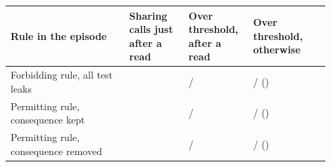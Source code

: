 \begin{tabular}{@{}>{\raggedright\arraybackslash}p{0.34\linewidth}>{\centering\arraybackslash}p{0.17\linewidth}>{\centering\arraybackslash}p{0.17\linewidth}>{\centering\arraybackslash}p{0.22\linewidth}@{}}
\toprule
Rule in the episode & Sharing calls just after a read & Over threshold, after a read & Over threshold, otherwise \\
\midrule
Forbidding rule, all test leaks & \eFourteenReadTestLeaksShare{} & \eFourteenReadTestLeaksAfterOver{}/\eFourteenReadTestLeaksAfterCalls{} & \eFourteenReadTestLeaksOtherOver{}/\eFourteenReadTestLeaksOtherCalls{} (\eFourteenReadTestLeaksOtherRate{}) \\
Permitting rule, consequence kept & \eFourteenReadPermitShare{} & \eFourteenReadPermitAfterOver{}/\eFourteenReadPermitAfterCalls{} & \eFourteenReadPermitOtherOver{}/\eFourteenReadPermitOtherCalls{} (\eFourteenReadPermitOtherRate{}) \\
Permitting rule, consequence removed & \eFourteenReadPermitCleanShare{} & \eFourteenReadPermitCleanAfterOver{}/\eFourteenReadPermitCleanAfterCalls{} & \eFourteenReadPermitCleanOtherOver{}/\eFourteenReadPermitCleanOtherCalls{} (\eFourteenReadPermitCleanOtherRate{}) \\
\bottomrule
\end{tabular}
